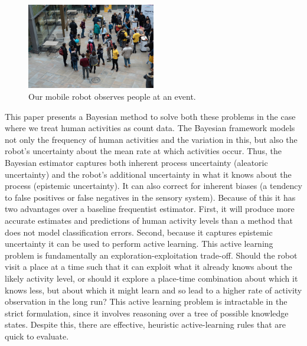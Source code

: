 \begin{figure}[t!]
	\centering

	\includegraphics[width=0.5\textwidth]{./figures/robot_in_human_environment.jpeg}
	\caption{Our mobile robot observes people at an event.} 
	\label{fig:robot_in_human_environment}
\end{figure}
This paper presents a Bayesian method to solve both these problems in the case where we treat human activities as count data. %
The Bayesian framework models not only the frequency of human activities and the variation in this, but also the robot's uncertainty about the mean rate at which activities occur. Thus, the Bayesian estimator captures both inherent process uncertainty (aleatoric uncertainty) and the robot's additional uncertainty in what it knows about the process (epistemic uncertainty). It can also correct for inherent biases (a tendency to false positives or false negatives in the sensory system). Because of this it has two advantages over a baseline frequentist estimator. First, it will produce more accurate estimates and predictions of human activity levels than a method that does not model classification errors. Second, because it captures epistemic uncertainty it can be used to perform active learning. This active learning problem is fundamentally an exploration-exploitation trade-off. Should the robot visit a place at a time such that it can exploit what it already knows about the likely activity level, or should it explore a place-time combination about which it knows less, but about which it might learn and so lead to a higher rate of activity observation in the long run? This active learning problem is intractable in the strict formulation, since it involves reasoning over a tree of possible knowledge states. Despite this, there are effective, heuristic active-learning rules that are quick to evaluate. %

